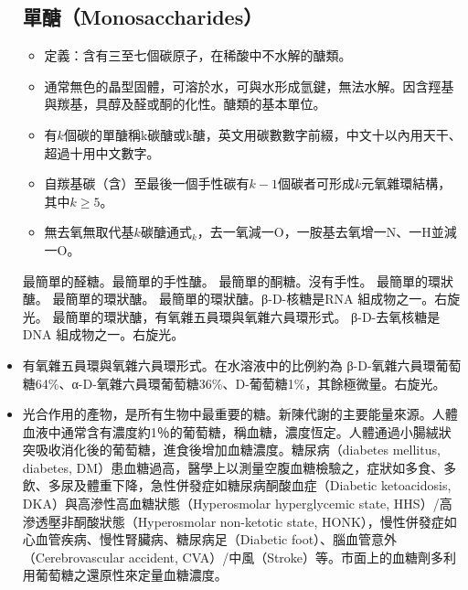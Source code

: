 \documentclass[a4paper,12pt]{report}
\begin{document}
\begin{itemize}
\subsection{單醣（Monosaccharides）}
\begin{itemize}
\item 定義：含有三至七個碳原子，在稀酸中不水解的醣類。
\item 通常無色的晶型固體，可溶於水，可與水形成氫鍵，無法水解。因含羥基與羰基，具醇及醛或酮的化性。醣類的基本單位。
\item 有$k$個碳的單醣稱k碳醣或k醣，英文用碳數數字前綴，中文十以內用天干、超過十用中文數字。
\item 自羰基碳（含）至最後一個手性碳有$k-1$個碳者可形成$k$元氧雜環結構，其中$k\geq 5$。
\item 無去氧無取代基$k$碳醣通式$_k$，去一氧減一O，一胺基去氧增一N、一H並減一O。
\end{itemize}
最簡單的醛糖。最簡單的手性醣。
最簡單的酮糖。沒有手性。
最簡單的環狀醣。
最簡單的環狀醣。
最簡單的環狀醣。β-D-核糖是RNA 組成物之一。右旋光。
最簡單的環狀醣，有氧雜五員環與氧雜六員環形式。
β-D-去氧核糖是DNA 組成物之一。右旋光。
\bit
\item 有氧雜五員環與氧雜六員環形式。在水溶液中的比例約為 β-D-氧雜六員環葡萄糖64\%、α-D-氧雜六員環葡萄糖36\%、D-葡萄糖1\%，其餘極微量。右旋光。
\item 光合作用的產物，是所有生物中最重要的糖。新陳代謝的主要能量來源。人體血液中通常含有濃度約1％的葡萄糖，稱血糖，濃度恆定。人體通過小腸絨狀突吸收消化後的葡萄糖，進食後增加血糖濃度。糖尿病（diabetes mellitus, diabetes, DM）患血糖過高，醫學上以測量空腹血糖檢驗之，症狀如多食、多飲、多尿及體重下降，急性併發症如糖尿病酮酸血症（Diabetic ketoacidosis, DKA）與高滲性高血糖狀態（Hyperosmolar hyperglycemic state, HHS）/高滲透壓非酮酸狀態（Hyperosmolar non-ketotic state, HONK），慢性併發症如心血管疾病、慢性腎臟病、糖尿病足（Diabetic foot）、腦血管意外（Cerebrovascular accident, CVA）/中風（Stroke）等。市面上的血糖劑多利用葡萄糖之還原性來定量血糖濃度。

\end{itemize}
\end{document}
